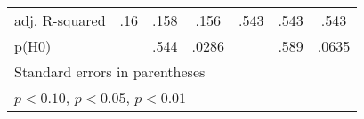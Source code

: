 \begin{table}[htbp]
\begin{tabular}{l*{6}{c}}
adj. R-squared  &      .16         &     .158         &     .156         &     .543         &     .543         &     .543         \\
p(H0)           &                  &     .544         &    .0286         &                  &     .589         &    .0635         \\
\hline\hline
\multicolumn{7}{l}{\footnotesize Standard errors in parentheses}\\
\multicolumn{7}{l}{\footnotesize \sym{*} \(p<0.10\), \sym{**} \(p<0.05\), \sym{***} \(p<0.01\)}\\
\end{tabular}
\end{table}
